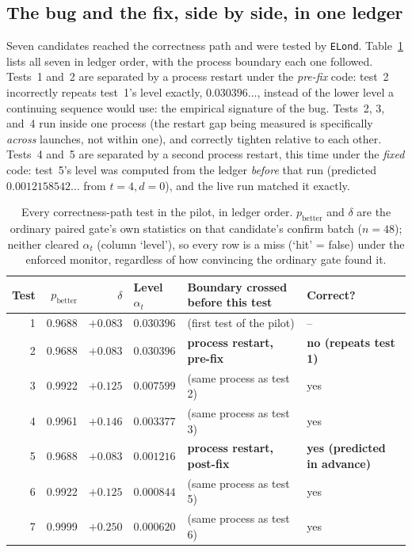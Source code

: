 \documentclass[11pt]{article}
\begin{document}
\subsection{The bug and the fix, side by side, in one ledger}

Seven candidates reached the correctness path and were tested by \texttt{ELond}. Table~\ref{tab:fdr} lists all seven in ledger order, with the process boundary each one followed. Tests~1 and~2 are separated by a process restart under the \emph{pre-fix} code: test~2 incorrectly repeats test~1's level exactly, $0.030396\ldots$, instead of the lower level a continuing sequence would use: the empirical signature of the bug. Tests~2, 3, and~4 run inside one process (the restart gap being measured is specifically \emph{across} launches, not within one), and correctly tighten relative to each other. Tests~4 and~5 are separated by a second process restart, this time under the \emph{fixed} code: test~5's level was computed from the ledger \emph{before} that run (predicted $0.0012158542\ldots$ from $t{=}4,d{=}0$), and the live run matched it exactly.

\begin{table}[h]
\centering\small
\caption{Every correctness-path test in the pilot, in ledger order. $p_\text{better}$ and $\delta$ are the ordinary paired gate's own statistics on that candidate's confirm batch ($n=48$); neither cleared $\alpha_t$ (column `level'), so every row is a miss (`hit' = false) under the enforced monitor, regardless of how convincing the ordinary gate found it.}
\label{tab:fdr}
\begin{tabular}{@{}rrrlll@{}}
\toprule
Test & $p_\text{better}$ & $\delta$ & Level $\alpha_t$ & Boundary crossed before this test & Correct? \\
\midrule
1 & 0.9688 & $+0.083$ & $0.030396$ & (first test of the pilot) & -- \\
2 & 0.9688 & $+0.083$ & $0.030396$ & \textbf{process restart, pre-fix} & \textbf{no (repeats test 1)} \\
3 & 0.9922 & $+0.125$ & $0.007599$ & (same process as test 2) & yes \\
4 & 0.9961 & $+0.146$ & $0.003377$ & (same process as test 3) & yes \\
5 & 0.9688 & $+0.083$ & $0.001216$ & \textbf{process restart, post-fix} & \textbf{yes (predicted in advance)} \\
6 & 0.9922 & $+0.125$ & $0.000844$ & (same process as test 5) & yes \\
7 & 0.9999 & $+0.250$ & $0.000620$ & (same process as test 6) & yes \\
\bottomrule
\end{tabular}
\end{table}
\end{document}
